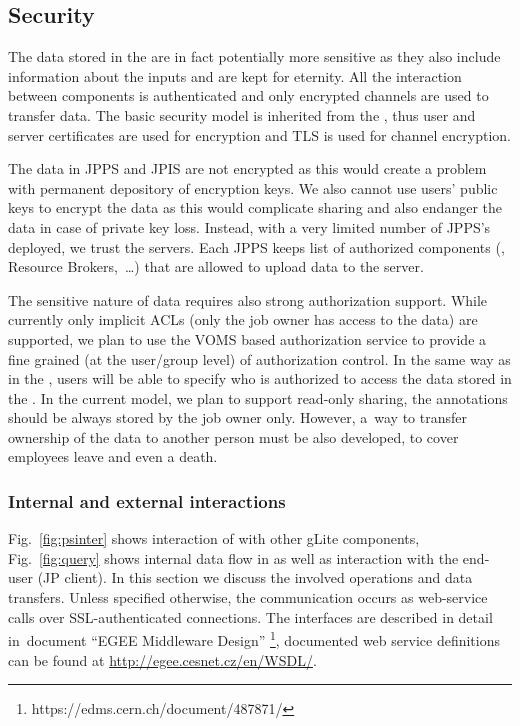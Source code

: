 \subsection{Security}

The data stored in the \JP are in fact potentially more
sensitive as they also include information about the inputs and are kept
for eternity. All the interaction between components is
authenticated and only encrypted channels are used to transfer data. The
basic security model is inherited from the \LB, thus user and server
certificates are used for encryption and TLS is used for channel
encryption.

The data in JPPS and JPIS are not encrypted as this would create a
problem with permanent depository of encryption keys. We also cannot use
users' public keys to encrypt the data as this would complicate sharing
and also endanger the data in case of private key loss. Instead, with a
very limited number of JPPS's deployed, we trust the \JP servers. Each
JPPS keeps list of authorized components (\LB, Resource Brokers,~\ldots) 
that are allowed to upload data to the \JP server.

The sensitive nature of data requires also strong authorization support.
While currently only implicit ACLs (only the job owner has access to
the data) are supported, we plan to use the VOMS
based authorization service to provide a fine grained (at the user/group
level) of authorization control. In the same way as in the \LB, users
will be able to specify who is authorized to access the data stored in
the \JP. In the current model, we plan to support read-only sharing, the
annotations should be always stored by the job owner only. However, a~way
to transfer ownership of the data to another person must be also
developed, to cover employees leave and even a death.

\iffalse
\subsubsection{Internal and external interactions}

Fig.~\ref{fig:psinter} shows interaction of \JP with other gLite components,
Fig.~\ref{fig:query} shows internal data flow in \JP as well as interaction
with the end-user (JP client).
In this section we discuss the involved operations and data transfers.
Unless specified otherwise, the communication occurs as web-service calls
over SSL-authenticated connections.
The interfaces are described in detail in~document ``EGEE Middleware Design''
\footnote{https://edms.cern.ch/document/487871/},
documented web service definitions can be found at \url{http://egee.cesnet.cz/en/WSDL/}.

